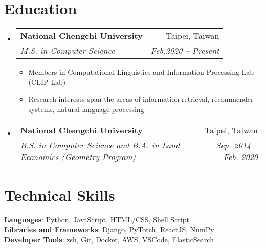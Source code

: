 \documentclass[letterpaper,11pt]{article}
\makeatletter
\newcommand{\resumeItem}[1]{
  \item\small{
    {#1 \vspace{-2pt}}
  }
}
\newcommand{\resumeSubheading}[4]{
  \vspace{-2pt}\item
    \begin{tabular*}{0.97\textwidth}[t]{l@{\extracolsep{\fill}}r}
      \textbf{#1} & #2 \\
      \textit{\small#3} & \textit{\small #4} \\
    \end{tabular*}\vspace{-7pt}
}
\newcommand{\resumeSubHeadingListStart}{\begin{itemize}[leftmargin=0.15in, label={}]}
\newcommand{\resumeSubHeadingListEnd}{\end{itemize}}
\newcommand{\resumeItemListStart}{\begin{itemize}}
\newcommand{\resumeItemListEnd}{\end{itemize}\vspace{-5pt}}
\makeatother
\begin{document}
\section{Education}
  \resumeSubHeadingListStart
    \resumeSubheading
      {National Chengchi University}{Taipei, Taiwan}
      {M.S. in Computer Science}{Feb.2020 -- Present}
    \resumeItemListStart
        \resumeItem{Members in Computational Linguistics and Information Processing Lab (CLIP Lab)}
        \resumeItem{Research interests span the areas of information retrieval, recommender systems, natural language processing}
    \resumeItemListEnd
    \resumeSubheading
      {National Chengchi University}{Taipei, Taiwan}
      {B.S. in Computer Science and B.A. in Land Economics (Geometry Program)}{Sep. 2014 -- Feb. 2020}
  \resumeSubHeadingListEnd

%
\section{Technical Skills}
 \begin{itemize}[leftmargin=0.15in, label={}]
    \small{\item{
     \textbf{Languages}{: Python,  JavaScript, HTML/CSS, Shell Script} \\
     \textbf{Libraries and Frameworks}{: Django, PyTorch, ReactJS, NumPy} \\
     \textbf{Developer Tools}{: zsh, Git, Docker, AWS, VSCode, ElasticSearch}
    }}
 \end{itemize}



\end{document}
